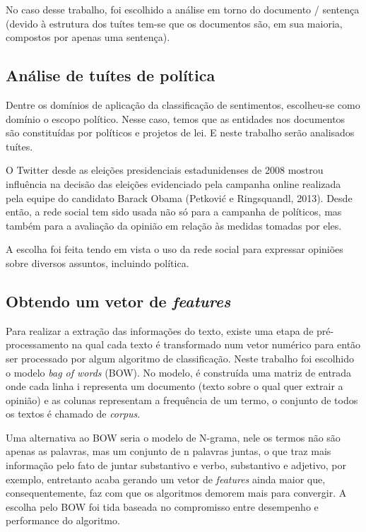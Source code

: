 No caso desse trabalho, foi escolhido a análise em torno do documento / sentença (devido à estrutura
dos tuítes tem-se que os documentos são, em sua maioria, compostos por apenas uma 
sentença). 

\subsection{Análise de tuítes de política}

Dentre os domínios de aplicação da classificação de sentimentos, escolheu-se como domínio o
escopo político. Nesse caso, temos que as entidades nos documentos são constituídas por
políticos e projetos de lei. E neste trabalho serão analisados tuítes.

O Twitter desde as eleições presidenciais estadunidenses de 2008 mostrou influência
na decisão das eleições evidenciado pela campanha online realizada pela equipe do
candidato Barack Obama (Petković e Ringsquandl, 2013)\citep{petkovic2013}. Desde então, 
a rede social tem sido usada não só para a campanha de políticos, mas também para a avaliação
da opinião em relação às medidas tomadas por eles.

A escolha foi feita tendo em vista o uso da rede social 
para expressar opiniões sobre diversos assuntos, incluindo política.


\subsection{Obtendo um vetor de \textit{features}}
\label{subsec:featurization}

Para realizar a extração das informações do texto, existe uma etapa de pré-processamento na qual
cada texto é transformado num vetor numérico para então ser processado por algum algoritmo de
classificação. Neste trabalho foi escolhido o modelo \textit{bag of words} (BOW). No modelo, 
é construída uma matriz de entrada onde cada linha i representa um documento (texto sobre o qual
quer extrair a opinião) e as colunas representam a frequência de um termo, o conjunto de todos os textos é chamado de \textit{corpus}.

Uma alternativa ao BOW seria o modelo de N-grama, nele os termos não são apenas as palavras, mas
um conjunto de n palavras juntas, o que traz mais informação pelo fato de juntar substantivo e verbo, substantivo e adjetivo, por exemplo, entretanto acaba gerando um vetor de \textit{features}
ainda maior que, consequentemente, faz com que os algoritmos demorem mais para convergir.
A escolha pelo BOW foi tida baseada no compromisso entre desempenho e performance do algoritmo.

